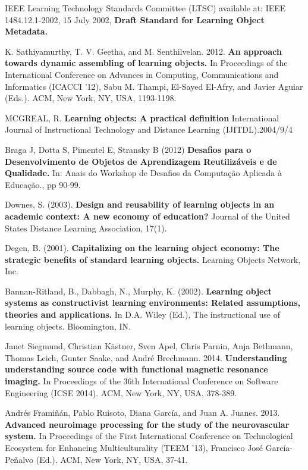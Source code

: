 \documentclass[12pt,openright,oneside,a4paper,english,french,spanish,brazil]{unifil}
\begin{document}
\begin{thebibliography}{99}

{IEEE Learning Technology Standards Committee (LTSC) available at: IEEE 1484.12.1-2002, 15 July 2002, \textbf{Draft Standard for Learning Object Metadata.}}

{K. Sathiyamurthy, T. V. Geetha, and M. Senthilvelan. 2012. \textbf{An approach towards dynamic assembling of learning objects.} In Proceedings of the International Conference on Advances in Computing, Communications and Informatics (ICACCI '12), Sabu M. Thampi, El-Sayed El-Afry, and Javier Aguiar (Eds.). ACM, New York, NY, USA, 1193-1198.}

{MCGREAL, R. \textbf{Learning objects: A practical definition} International Journal of Instructional Technology and Distance Learning (IJITDL).2004/9/4}

{Braga J, Dotta S, Pimentel E, Stransky B (2012) \textbf{Desafios para o
Desenvolvimento de Objetos de Aprendizagem Reutilizáveis e de Qualidade.} In: Anais do Workshop de Desafios da Computação Aplicada à Educação., pp 90-99.}

{Downes, S. (2003). \textbf{Design and reusability of learning objects in an academic context: A new economy of education?} Journal of the United States Distance Learning Association, 17(1).}

{Degen, B. (2001). \textbf{Capitalizing on the learning object economy: The strategic benefits of standard learning objects.} Learning Objects Network, Inc.}

{Bannan-Ritland, B., Dabbagh, N., Murphy, K. (2002). \textbf{Learning object systems as constructivist learning environments: Related assumptions, theories and applications.} In D.A. Wiley (Ed.), The instructional
use of learning objects. Bloomington, IN.}

{Janet Siegmund, Christian Kästner, Sven Apel, Chris Parnin, Anja Bethmann, Thomas Leich, Gunter Saake, and André Brechmann. 2014. \textbf{Understanding understanding source code with functional magnetic resonance imaging.} In Proceedings of the 36th International Conference on Software Engineering (ICSE 2014). ACM, New York, NY, USA, 378-389.}

{Andrés Framiñán, Pablo Ruisoto, Diana García, and Juan A. Juanes. 2013. \textbf{Advanced neuroimage processing for the study of the neurovascular system.} In Proceedings of the First International Conference on Technological Ecosystem for Enhancing Multiculturality (TEEM '13), Francisco José García-Peñalvo (Ed.). ACM, New York, NY, USA, 37-41.}


\end{thebibliography}
\end{document}
